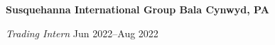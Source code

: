 \textbf{Susquehanna International Group \hfill Bala Cynwyd, PA}\par

\textit{Trading Intern} \hfill Jun 2022--Aug 2022